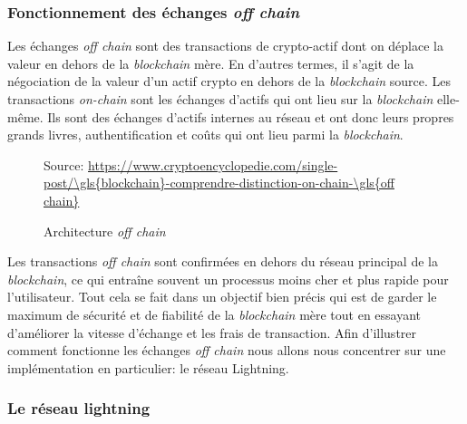 \subsubsection{Fonctionnement des échanges \textit{\gls{off chain}}}
Les échanges \textit{\gls{off chain}} sont des transactions de crypto-\gls{actif} dont on déplace la valeur en dehors de la \textit{\gls{blockchain}} mère. En d’autres termes, il s’agit de la négociation de la valeur d’un \gls{actif} crypto en dehors de la \textit{\gls{blockchain}} source. Les transactions \textit{on-chain} sont les échanges d'\gls{actif}s qui ont lieu sur la \textit{\gls{blockchain}} elle-même.
Ils sont des échanges d’\gls{actif}s internes au réseau et ont donc leurs propres grands livres, authentification et coûts qui ont lieu parmi la \textit{\gls{blockchain}}.
\begin{figure}[h!]
    \centering
    {\scriptsize Source: \url{https://www.cryptoencyclopedie.com/single-post/\gls{blockchain}-comprendre-distinction-on-chain-\gls{off chain}}}
    \caption{Architecture \textit{\gls{off chain}}}
    \label{fig:offchain}
\end{figure}
Les transactions \textit{\gls{off chain}} sont confirmées en dehors du réseau principal de la \textit{\gls{blockchain}}, ce qui entraîne souvent un processus moins cher et plus rapide pour l’utilisateur. 
Tout cela se fait dans un objectif bien précis qui est de garder le maximum de sécurité et de fiabilité de la \textit{\gls{blockchain}} mère tout en essayant d'améliorer la vitesse d'échange et les frais de transaction.
Afin d'illustrer comment fonctionne les échanges \textit{\gls{off chain}} nous allons nous concentrer sur une implémentation en particulier: le réseau Lightning. 

\subsubsection{Le réseau lightning}


